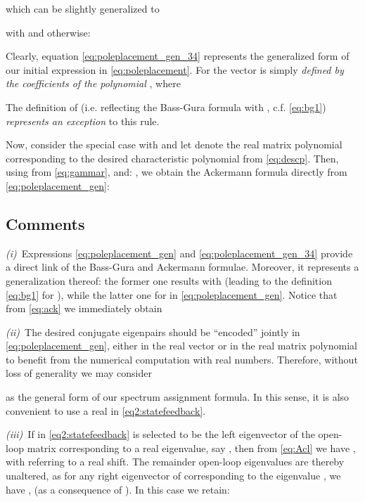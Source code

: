 \documentclass[conference]{IEEEtran}
\begin{document}
which can be slightly generalized to

with  and otherwise:

Clearly, equation \eqref{eq:poleplacement_gen_34} represents the generalized form of our initial expression in \eqref{eq:poleplacement}. For  the vector  is simply \emph{defined by the coefficients of the polynomial }, where

The definition of  (i.e. reflecting the Bass-Gura formula with , c.f. \eqref{eq:bg1}) \emph{represents an exception} to this rule.

Now, consider  the special case with  and let  denote the real matrix polynomial corresponding to the desired characteristic polynomial  from \eqref{eq:descp}.
Then, using  from \eqref{eq:gammar}, and:
,
we obtain  the Ackermann formula directly from \eqref{eq:poleplacement_gen}:


\subsection{Comments}



\emph{(i)}~Expressions \eqref{eq:poleplacement_gen}
and \eqref{eq:poleplacement_gen_34} provide a direct link of the
Bass-Gura and Ackermann formulae. Moreover, it represents a
generalization thereof: the former one results with  (leading to the definition \eqref{eq:bg1} for ), while the latter one   for  in  \eqref{eq:poleplacement_gen}. Notice that from \eqref{eq:ack} we immediately obtain





\emph{(ii)}~The desired conjugate eigenpairs should be ``encoded'' jointly in \eqref{eq:poleplacement_gen}, either in the real vector  or in the real matrix polynomial  to benefit from the numerical computation with real numbers. Therefore, without loss of generality we may consider

as the general form of our spectrum assignment formula. In this sense, it is also convenient to use a real  in
\eqref{eq2:statefeedback}.

\emph{(iii)}~If  in \eqref{eq2:statefeedback} is selected to be the left eigenvector of the open-loop matrix  corresponding to a real eigenvalue, say , then from \eqref{eq:Acl} we have , with  referring to a real shift. The remainder open-loop eigenvalues  are thereby unaltered, as for any right eigenvector  of  corresponding to the eigenvalue , we have ,  (as a consequence of ). In this case we retain:
\end{document}
